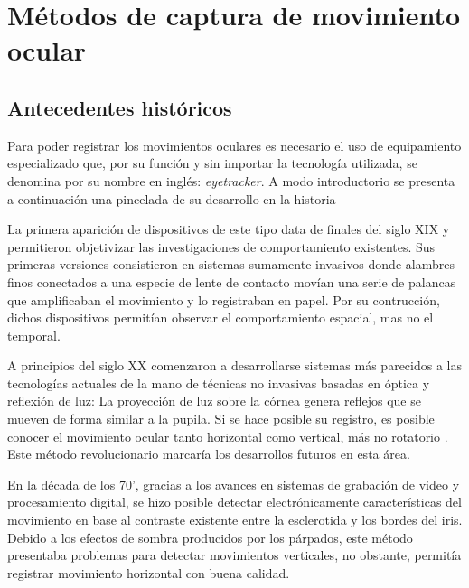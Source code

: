\documentclass[../main.tex]{subfiles}
\begin{document}
	\section{Métodos de captura de movimiento ocular}
	\label{sub:02_metodos_de_captura}
		\subsection{Antecedentes históricos} 
		\label{sub:02_antecedentes_historicos}
			Para poder registrar los movimientos oculares es necesario el uso de equipamiento especializado que, por su función y sin importar la tecnología utilizada, se denomina por su nombre en inglés: \textit{\gls{eyetracker}}. A modo introductorio se presenta a continuación una pincelada de su desarrollo en la historia \cite{article:eyetracker_eggert, article:eyetracker_richardson}

			La primera aparición de dispositivos de este tipo data de finales del siglo XIX \cite{article:eyetracker_hist1, article:eyetracker_hist2} y permitieron objetivizar las investigaciones de comportamiento existentes. Sus primeras versiones consistieron en sistemas sumamente invasivos donde alambres finos conectados a una especie de lente de contacto movían una serie de palancas que amplificaban el movimiento y lo registraban en papel. Por su contrucción, dichos dispositivos permitían observar el comportamiento espacial, mas no el temporal. 

			A principios del siglo XX comenzaron a desarrollarse sistemas más parecidos a las tecnologías actuales de la mano de técnicas no invasivas basadas en óptica y reflexión de luz: La proyección de luz sobre la córnea genera reflejos que se mueven de forma similar a la pupila. Si se hace posible su registro, es posible conocer el movimiento ocular tanto horizontal como vertical, más no rotatorio \cite{article:eyetracker_hist3}. Este método revolucionario marcaría los desarrollos futuros en esta área.

			En la década de los 70', gracias a los avances en sistemas de grabación de video y procesamiento digital, se hizo posible detectar electrónicamente características del movimiento en base al contraste existente entre la \gls{esclerotida} y los bordes del iris. Debido a los efectos de sombra producidos por los párpados, este método presentaba problemas para detectar movimientos verticales, no obstante, permitía registrar movimiento horizontal con buena calidad. 
\end{document}
